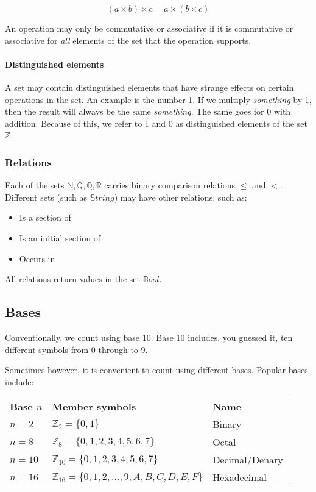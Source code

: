 \documentclass{article}
\begin{document}
\[
	(a \times b) \times c = a \times (b \times c)
\]

An operation may only be commutative or associative if it is commutative or associative for {\it all} elements of the set that the operation supports.

\paragraph{Distinguished elements}

A set may contain distinguished elements that have strange effects on certain operations in the set. An example is the number 1. If we multiply {\it something} by 1, then the result will always be the same {\it something}. The same goes for 0 with addition. Because of this, we refer to 1 and 0 as distinguished elements of the set $\mathbb{Z}$.

\subsubsection{Relations}

Each of the sets $\mathbb{N, Q, Q, R}$ carries binary comparison relations $\leq$ and $<$. Different sets (such as $\mathbb{S}tring$) may have other relations, such as:

\begin{itemize}
	\item Is a section of
	\item Is an initial section of
	\item Occurs in
\end{itemize}

All relations return values in the set $\mathbb{B}ool$.

\subsection{Bases}

Conventionally, we count using base 10. Base 10 includes, you guessed it, ten different symbols from 0 through to 9.

Sometimes however, it is convenient to count using different bases. Popular bases include:

\begin{tabular}{l l l}
	{\bf Base $n$} & {\bf Member symbols} & {\bf Name}\\
	$n = 2$ & $\mathbb{Z}_2 = \{0, 1\}$ & Binary\\
	$n = 8$ & $\mathbb{Z}_8 = \{0, 1, 2, 3, 4, 5, 6, 7\}$ & Octal\\
	$n = 10$ & $\mathbb{Z}_{10} = \{0, 1, 2, 3, 4, 5, 6, 7\}$ & Decimal/Denary\\
	$n = 16$ & $\mathbb{Z}_{16} = \{0, 1, 2, \ldots ,9, A, B, C, D, E, F\}$ & Hexadecimal\\
\end{tabular}
\end{document}
